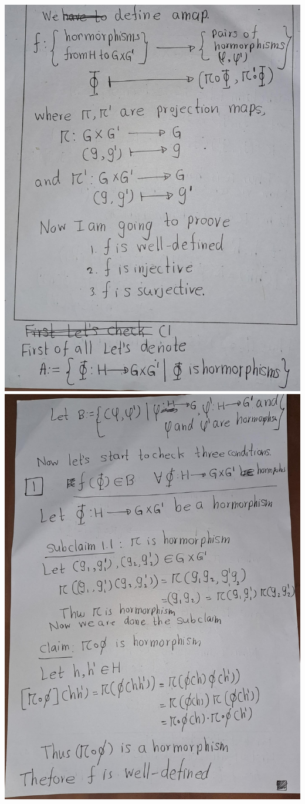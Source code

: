 \documentclass[
]{book}
\theoremstyle{definition}
\theoremstyle{definition}
\theoremstyle{definition}
\theoremstyle{definition}
\theoremstyle{remark}
\begin{document}
\includegraphics{figures/ch_2/fig11.jpg}
\includegraphics{figures/ch_2/fig12.jpg}
\end{document}
